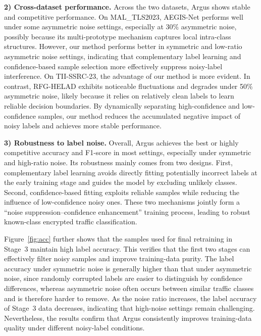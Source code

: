 \documentclass{SCIS2026}
\begin{document}
\textbf{2) Cross-dataset performance.}
Across the two datasets, Argus shows stable and competitive performance. On MAL\_TLS2023, AEGIS-Net performs well under some asymmetric noise settings, especially at 30\% asymmetric noise, possibly because its multi-prototype mechanism captures local intra-class structures. However, our method performs better in symmetric and low-ratio asymmetric noise settings, indicating that complementary label learning and confidence-based sample selection more effectively suppress noisy-label interference. On TII-SSRC-23, the advantage of our method is more evident. In contrast, RFG-HELAD exhibits noticeable fluctuations and degrades under 50\% asymmetric noise, likely because it relies on relatively clean labels to learn reliable decision boundaries. By dynamically separating high-confidence and low-confidence samples, our method reduces the accumulated negative impact of noisy labels and achieves more stable performance.

\textbf{3) Robustness to label noise.}
Overall, Argus achieves the best or highly competitive accuracy and F1-score in most settings, especially under symmetric and high-ratio noise. Its robustness mainly comes from two designs. First, complementary label learning avoids directly fitting potentially incorrect labels at the early training stage and guides the model by excluding unlikely classes. Second, confidence-based fitting exploits reliable samples while reducing the influence of low-confidence noisy ones. These two mechanisms jointly form a ``noise suppression--confidence enhancement'' training process, leading to robust known-class encrypted traffic classification.

Figure~\ref{fig:acc} further shows that the samples used for final retraining in Stage~3 maintain high label accuracy. This verifies that the first two stages can effectively filter noisy samples and improve training-data purity. The label accuracy under symmetric noise is generally higher than that under asymmetric noise, since randomly corrupted labels are easier to distinguish by confidence differences, whereas asymmetric noise often occurs between similar traffic classes and is therefore harder to remove. As the noise ratio increases, the label accuracy of Stage~3 data decreases, indicating that high-noise settings remain challenging. Nevertheless, the results confirm that Argus consistently improves training-data quality under different noisy-label conditions.
\end{document}
